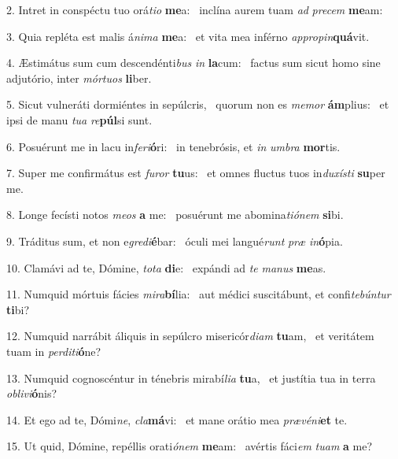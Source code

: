 2. Intret in conspéctu tuo orá\textit{ti}\textit{o} \textbf{me}a: \ast\  inclína aurem tuam \textit{ad} \textit{pre}\textit{cem} \textbf{me}am:\

3. Quia repléta est malis á\textit{ni}\textit{ma} \textbf{me}a: \ast\  et vita mea inférno \textit{ap}\textit{pro}\textit{pin}\textbf{quá}vit.\

4. Æstimátus sum cum descendénti\textit{bus} \textit{in} \textbf{la}cum: \ast\  factus sum sicut homo sine adjutório, inter \textit{mór}\textit{tu}\textit{os} \textbf{li}ber.\

5. Sicut vulneráti dormiéntes in sepúlcris, \dag\  quorum non es \textit{me}\textit{mor} \textbf{ám}plius: \ast\  et ipsi de manu \textit{tu}\textit{a} \textit{re}\textbf{púl}si sunt.\

6. Posuérunt me in lacu in\textit{fe}\textit{ri}\textbf{ó}ri: \ast\  in tenebrósis, et \textit{in} \textit{um}\textit{bra} \textbf{mor}tis.\

7. Super me confirmátus est \textit{fu}\textit{ror} \textbf{tu}us: \ast\  et omnes fluctus tuos in\textit{du}\textit{xís}\textit{ti} \textbf{su}per me.\

8. Longe fecísti notos \textit{me}\textit{os} \textbf{a} me: \ast\  posuérunt me abomina\textit{ti}\textit{ó}\textit{nem} \textbf{si}bi.\

9. Tráditus sum, et non e\textit{gre}\textit{di}\textbf{é}bar: \ast\  óculi mei langué\textit{runt} \textit{præ} \textit{in}\textbf{ó}pia.\

10. Clamávi ad te, Dómine, \textit{to}\textit{ta} \textbf{di}e: \ast\  expándi ad \textit{te} \textit{ma}\textit{nus} \textbf{me}as.\

11. Numquid mórtuis fácies \textit{mi}\textit{ra}\textbf{bí}lia: \ast\  aut médici suscitábunt, et confi\textit{te}\textit{bún}\textit{tur} \textbf{ti}bi?\

12. Numquid narrábit áliquis in sepúlcro misericór\textit{di}\textit{am} \textbf{tu}am, \ast\  et veritátem tuam in \textit{per}\textit{di}\textit{ti}\textbf{ó}ne?\

13. Numquid cognoscéntur in ténebris mirabí\textit{li}\textit{a} \textbf{tu}a, \ast\  et justítia tua in terra \textit{ob}\textit{li}\textit{vi}\textbf{ó}nis?\

14. Et ego ad te, Dómi\textit{ne}, \textit{cla}\textbf{má}vi: \ast\  et mane orátio mea \textit{præ}\textit{vé}\textit{ni}\textbf{et} te.\

15. Ut quid, Dómine, repéllis orati\textit{ó}\textit{nem} \textbf{me}am: \ast\  avértis fáci\textit{em} \textit{tu}\textit{am} \textbf{a} me?\

